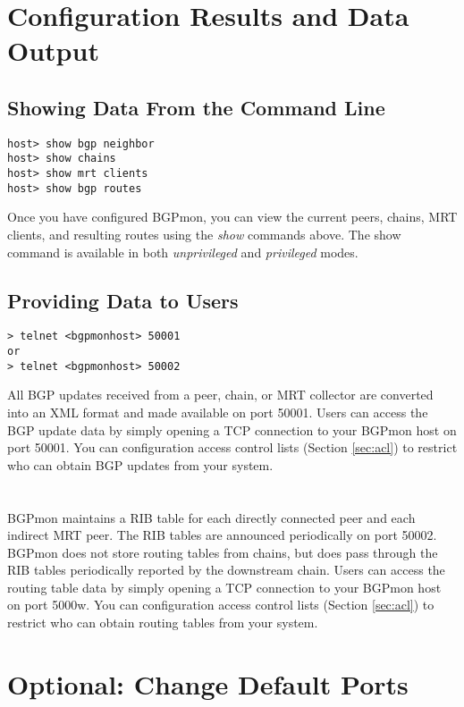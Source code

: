 \documentclass{article}
\begin{document}
\section{Configuration Results and Data Output}
\label{sec:output}

\subsection{Showing Data From the Command Line} 
\begin{Verbatim}[frame=single]
host> show bgp neighbor
host> show chains
host> show mrt clients
host> show bgp routes
\end{Verbatim}
Once you have configured BGPmon,  you can view the current peers,  chains,  MRT clients, and resulting routes using the \emph{show} commands above.   The show command is available in both \emph{unprivileged} and \emph{privileged} modes.

\subsection{Providing Data to Users} 
\begin{Verbatim}[frame=single]
> telnet <bgpmonhost> 50001
or
> telnet <bgpmonhost> 50002
\end{Verbatim}

All BGP updates received from a peer,  chain, or MRT collector are converted into an XML format and made available on port 50001.   Users can access the BGP update data by simply opening a TCP connection to your BGPmon host on port 50001.   You can configuration access control lists (Section \ref{sec:acl}) to restrict who can obtain BGP updates from your system.   \\
\\
\\
BGPmon maintains a RIB table for each directly connected peer and each indirect MRT peer.   The RIB tables are announced periodically on port 50002.   BGPmon does not store routing tables from chains,  but does pass through the RIB tables periodically reported by the downstream chain.   Users can access the routing table data by simply opening a TCP connection to your BGPmon host on port 5000w.   You can configuration access control lists (Section \ref{sec:acl}) to restrict who can obtain routing tables from your system.   \\

\section{Optional: Change Default Ports}
\label{sec:ports}
\end{document}
